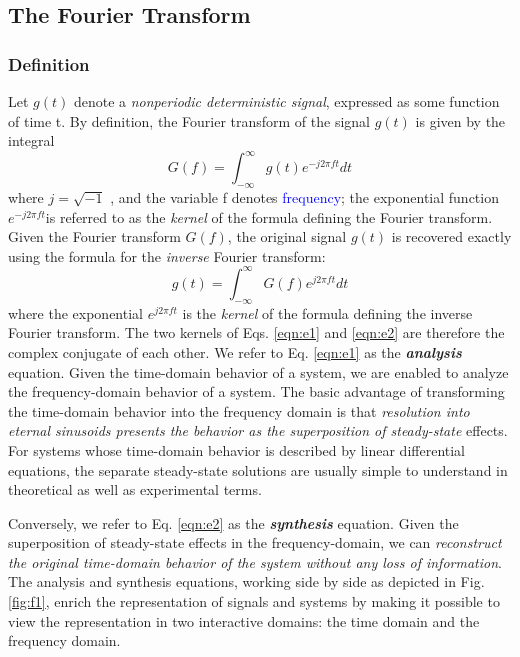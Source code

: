 \documentclass{article}
\begin{document}
\subsection{The Fourier Transform}
\label{sec:fourier_transform}
\subsubsection{Definition}
Let $g(t)$ denote a \textit{nonperiodic deterministic signal}, expressed as some function of time t.
By definition, the Fourier transform of the signal $ g(t)$ is given by the integral
\begin{equation}
    G(f) = \int_{-\infty}^{\infty} g(t) e^{-j2\pi ft}dt
    \label{eqn:e1}
\end{equation}
where $j = \sqrt{-1}$ , and the variable f denotes \textcolor{blue}{frequency}; the exponential function
$ e^{-j2\pi ft} $is referred to as the \textit{kernel} of the formula defining the Fourier transform.
Given the Fourier transform $G(f) $, the original signal $g(t)$  is recovered exactly using the formula for the \textit{inverse} Fourier transform:
\begin{equation}
    g(t) = \int_{-\infty}^{\infty} G(f) e^{j2\pi ft}dt
    \label{eqn:e2}
\end{equation}
where the exponential $ e^{j2\pi ft} $ is the \textit{kernel} of the formula defining the inverse Fourier
transform. The two kernels of Eqs. \ref{eqn:e1} and \ref{eqn:e2} are therefore the complex conjugate of
each other.
We refer to Eq. \ref{eqn:e1} as the \textbf{\textit{analysis}} equation. Given the time-domain behavior of a
system, we are enabled to analyze the frequency-domain behavior of a system. The basic
advantage of transforming the time-domain behavior into the frequency domain is that
\textit{resolution into eternal sinusoids presents the behavior as the superposition of steady-state}
effects. For systems whose time-domain behavior is described by linear differential equations, the separate steady-state solutions are usually simple to understand in theoretical as
well as experimental terms.
\par Conversely, we refer to Eq. \ref{eqn:e2} as the \textbf{\textit{synthesis}} equation. Given the superposition
of steady-state effects in the frequency-domain, we can \textit{reconstruct the original time-domain
behavior of the system without any loss of information}. The analysis and synthesis equations, working side by side as depicted in Fig. \ref{fig:f1}, enrich the representation of signals and systems by making it possible to view the representation in two interactive domains: the
time domain and the frequency domain.
\end{document}
